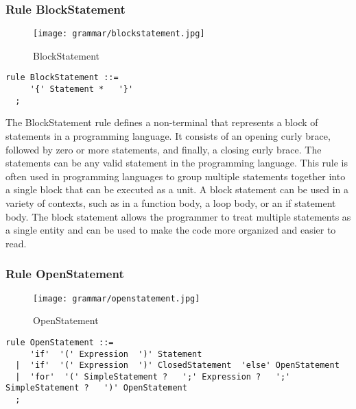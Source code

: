 \subsubsection*{Rule BlockStatement}

\begin{figure}[!ht]
\centering
\texttt{[image: grammar/blockstatement.jpg]}
\caption{BlockStatement}
\end{figure}

\begin{lstlisting}
rule BlockStatement ::=
     '{' Statement *   '}' 
  ;
\end{lstlisting}

The BlockStatement rule defines a non-terminal that represents a block of statements in a programming language. It consists of an opening curly brace, followed by zero or more statements, and finally, a closing curly brace. The statements can be any valid statement in the programming language. This rule is often used in programming languages to group multiple statements together into a single block that can be executed as a unit. A block statement can be used in a variety of contexts, such as in a function body, a loop body, or an if statement body. The block statement allows the programmer to treat multiple statements as a single entity and can be used to make the code more organized and easier to read.

\subsubsection*{Rule OpenStatement}

\begin{figure}
\centering
\texttt{[image: grammar/openstatement.jpg]}
\caption{OpenStatement}
\end{figure}

\begin{lstlisting}
rule OpenStatement ::=
     'if'  '(' Expression  ')' Statement 
  |  'if'  '(' Expression  ')' ClosedStatement  'else' OpenStatement 
  |  'for'  '(' SimpleStatement ?   ';' Expression ?   ';' SimpleStatement ?   ')' OpenStatement 
  ;
\end{lstlisting}

